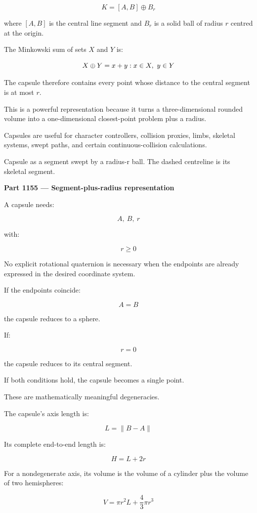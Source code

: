 \[
\boxed{ K=[A,B]\oplus B_r }
\]

where \([A,B]\) is the central line segment and \(B_r\) is a solid ball of radius \(r\) centred at the origin.

The Minkowski sum of sets \(X\) and \(Y\) is:

\[
X\oplus Y=\\{x+y:x\in X,\ y\in Y\\}
\]

The capsule therefore contains every point whose distance to the central segment is at most \(r\).

This is a powerful representation because it turns a three-dimensional rounded volume into a one-dimensional closest-point problem plus a radius.

Capsules are useful for character controllers, collision proxies, limbs, skeletal systems, swept paths, and certain continuous-collision calculations.

Capsule as a segment swept by a radius-r ball. The dashed centreline is its skeletal segment.

\textbf{Part 1155 --- Segment-plus-radius representation}

A capsule needs:

\[
A,\ B,\ r
\]

with:

\[
r\ge0
\]

No explicit rotational quaternion is necessary when the endpoints are already expressed in the desired coordinate system.

If the endpoints coincide:

\[
A=B
\]

the capsule reduces to a sphere.

If:

\[
r=0
\]

the capsule reduces to its central segment.

If both conditions hold, the capsule becomes a single point.

These are mathematically meaningful degeneracies.

The capsule's axis length is:

\[
L=\|B-A\|
\]

Its complete end-to-end length is:

\[
H=L+2r
\]

For a nondegenerate axis, its volume is the volume of a cylinder plus the volume of two hemispheres:

\[
\boxed{ V=\pi r^2L+\frac43\pi r^3 }
\]

